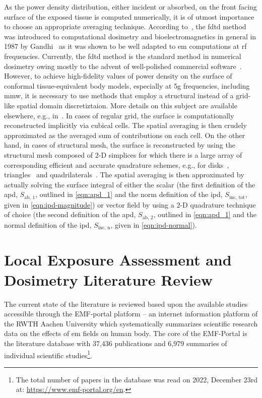 As the power density distribution, either incident or absorbed, on the front facing surface of the exposed tissue is computed numerically, it is of utmost importance to choose an appropriate averaging technique.
According to~\cite{Foster2022Three}, the \gls{fdtd} method was introduced to computational dosimetry and bioelectromagnetics in general in 1987 by Gandhi~\cite{Sullivan1987Use} as it was shown to be well adapted to \gls{em} computations at \gls{rf} frequencies.
Currently, the \gls{fdtd} method is the standard method in numerical dosimetry owing mostly to the advent of well-polished commercial software~\cite{Hirata2021Human}.
However, to achieve high-fidelity values of power density on the surface of conformal tissue-equivalent body models, especially at \gls{5g} frequencies, including \gls{mmw}, it is necessary to use methods that employ a structural instead of a grid-like spatial domain discretiztaion.
More details on this subject are available elsewhere, e.g., in~\cite{Poljak2018On}.
In cases of regular grid, the surface is computationally reconstructed implicitly via cubical cells.
The spatial averaging is then crudely approximated as the averaged sum of contributions on each cell.
On the other hand, in cases of structural mesh, the surface is reconstructed by using the structural mesh composed of 2-D simplices for which there is a large array of corresponding efficient and accurate quadrature schemes, e.g., for disks~\cite{Kim1997Symemetric}, triangles~\cite{Dunavant1985High} and quadrilaterals~\cite{Dunavant1985Economical}.
The spatial averaging is then approximated by actually solving the surface integral of either the scalar (the first definition of the \gls{apd}, $S_\text{ab, 1}$, outlined in \cref{eqn:apd_1} and the norm definition of the \gls{ipd}, $S_\text{inc, tot}$, given in \cref{eqn:ipd-magnitude}) or vector field by using a 2-D quadrature technique of choice (the second definition of the \gls{apd}, $S_\text{ab, 2}$, outlined in \cref{eqn:apd_1} and the normal definition of the \gls{ipd}, $S_\text{inc, n}$, given in \cref{eqn:ipd-normal}).

\section{Local Exposure Assessment and Dosimetry Literature Review}
The current state of the literature is reviewed based upon the available studies accessible through the EMF-portal platform -- an internet information platform of the RWTH Aachen University which systematically summarizes scientific research data on the effects of \gls{em} fields on human body.
The core of the EMF-Portal is the literature database with 37,436 publications and 6,979 summaries of individual scientific studies\footnote{The total number of papers in the database was read on 2022, December 23rd at: \url{https://www.emf-portal.org/en}.}.

